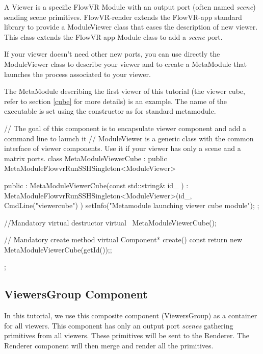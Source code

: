 \documentclass[a4paper,12pt,titlepage]{article}
\begin{document}
A Viewer is a specific FlowVR Module with an output port (often named \textit{scene}) sending scene primitives. FlowVR-render extends the FlowVR-app standard library to provide a ModuleViewer class that eases the description of new viewer. This class extends the FlowVR-app Module class to add a \textit{scene} port. \par

If your viewer doesn't need other new ports, you can use directly the ModuleViewer class to describe your viewer and to create a MetaModule that launches the process associated to your viewer. \par

The MetaModule describing the first viewer of this tutorial (the viewer cube, refer to section \ref{cube} for more details) is an example. The name of the executable is set using the constructor as for standard metamodule.\par

\begin{codeflowvr_cpp}
    // The goal of this component is to encapsulate viewer component and add a command line to launch it
    // ModuleViewer is a generic class with the common interface of viewer components. Use it if your viewer has only a scene and a matrix ports.
    class MetaModuleViewerCube : public MetaModuleFlowvrRunSSHSingleton<ModuleViewer>
    {
    public :
    MetaModuleViewerCube(const std::string& id_ ) : MetaModuleFlowvrRunSSHSingleton<ModuleViewer>(id_, CmdLine("viewercube") )
    {
    setInfo("Metamodule launching viewer cube  module");
    };

    //Mandatory virtual destructor
    virtual ~MetaModuleViewerCube(){};

    // Mandatory create  method
    virtual Component* create() const { return new MetaModuleViewerCube(getId());};
    };
\end{codeflowvr_cpp} \par

\subsection{ViewersGroup Component}

In this tutorial, we use this composite component (ViewersGroup) as a container for all viewers. This component has only an output port \textit{scenes} gathering primitives from all viewers. These primitives will be sent to the Renderer. The Renderer component will then merge and render all the primitives.\par 
\end{document}
